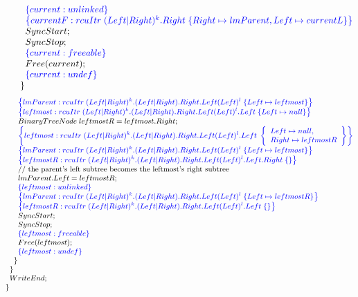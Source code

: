 \[\begin{array}{@{}l@{}}
                \;\;\;\;\;\;\;\;\specline{current:unlinked }\\
                \;\;\;\;\;\;\;\;\specline{currentF:rcuItr \; (Left|Right)^{k}.Right \; \{Right\mapsto lmParent, Left\mapsto currentL\}}\\
                \;\;\;\;\;\;\;\;SyncStart;\\
                \;\;\;\;\;\;\;\;SyncStop;\\
                \;\;\;\;\;\;\;\;\specline{current:freeable}\\
                \;\;\;\;\;\;\;\;Free(current);\\
                \;\;\;\;\;\;\;\;\specline{current:undef}\\
          \;\;\;\;\;\;\}\\
 \end{array}
\]
\[\small
\begin{array}{@{}l@{}}
        \;\;\;\;\;\;\specline{lmParent:rcuItr\; (Left|Right)^{k}.(Left|Right).Right.Left(Left)^{l} \; \{Left \mapsto leftmost\} }\\
        \;\;\;\;\;\;\specline{leftmost:rcuItr\; (Left|Right)^{k}.(Left|Right).Right.Left(Left)^{l}.Left \; \{Left \mapsto null\} }\\
        \;\;\;\;\;\;BinaryTreeNode\; leftmostR = leftmost.Right;\\
        \;\;\;\;\;\;\specline{leftmost:rcuItr\; (Left|Right)^{k}.(Left|Right).Right.Left(Left)^{l}.Left \;  \left\{ \begin{array}{ll} Left \mapsto null, \\ Right \mapsto leftmostR \end{array} \right\} }\\
        \;\;\;\;\;\;\specline{lmParent:rcuItr\; (Left|Right)^{k}.(Left|Right).Right.Left(Left)^{l} \; \{Left \mapsto leftmost\} }\\
        \;\;\;\;\;\;\specline{leftmostR:rcuItr\; (Left|Right)^{k}.(Left|Right).Right.Left(Left)^{l}.Left.Right \; \{\} }\\
        \;\;\;\;\;\;\text{// the parent's left subtree becomes the leftmost's right subtree}\\
        \;\;\;\;\;\;lmParent.Left = leftmostR;\\
        \;\;\;\;\;\;\specline{leftmost:unlinked  }\\
        \;\;\;\;\;\;\specline{lmParent:rcuItr\; (Left|Right)^{k}.(Left|Right).Right.Left(Left)^{l} \; \{Left \mapsto leftmostR\} }\\
        \;\;\;\;\;\;\specline{leftmostR:rcuItr\; (Left|Right)^{k}.(Left|Right).Right.Left(Left)^{l}.Left \; \{\} }\\
        \;\;\;\;\;\;SyncStart;\\
        \;\;\;\;\;\;SyncStop;\\
		\;\;\;\;\;\;\specline{leftmost:freeable}\\
        \;\;\;\;\;\;Free(leftmost);\\
        \;\;\;\;\;\;\specline{leftmost:undef}\\
        \;\;\;\;\}\\
    \;\;\}\\
     \;\;WriteEnd;\\
\}


\end{array}\]
